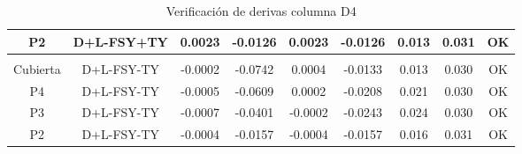 \begin{table}[H]
{\begin{tabular}{|c|c|c|c|c|c|c|c|c|}
    \hline
    P2  & D+L-FSY+TY & 0.0023 & -0.0126 & 0.0023 & -0.0126 & 0.013 & 0.031 & \cellcolor[rgb]{ .776,  .937,  .808}\textcolor[rgb]{ 0,  .38,  0}{OK} \bigstrut\\
    \hline
    \multicolumn{1}{|r}{} & \multicolumn{1}{r}{} & \multicolumn{1}{r}{} & \multicolumn{1}{r}{} & \multicolumn{1}{r}{} & \multicolumn{1}{r}{} & \multicolumn{1}{r}{} & \multicolumn{1}{r}{} &  \bigstrut\\
    \hline
    Cubierta & D+L-FSY-TY & -0.0002 & -0.0742 & 0.0004 & -0.0133 & 0.013 & 0.030 & \cellcolor[rgb]{ .776,  .937,  .808}\textcolor[rgb]{ 0,  .38,  0}{OK} \bigstrut\\
    \hline
    P4  & D+L-FSY-TY & -0.0005 & -0.0609 & 0.0002 & -0.0208 & 0.021 & 0.030 & \cellcolor[rgb]{ .776,  .937,  .808}\textcolor[rgb]{ 0,  .38,  0}{OK} \bigstrut\\
    \hline
    P3  & D+L-FSY-TY & -0.0007 & -0.0401 & -0.0002 & -0.0243 & 0.024 & 0.030 & \cellcolor[rgb]{ .776,  .937,  .808}\textcolor[rgb]{ 0,  .38,  0}{OK} \bigstrut\\
    \hline
    P2  & D+L-FSY-TY & -0.0004 & -0.0157 & -0.0004 & -0.0157 & 0.016 & 0.031 & \cellcolor[rgb]{ .776,  .937,  .808}\textcolor[rgb]{ 0,  .38,  0}{OK} \bigstrut\\
    \hline
    \end{tabular}}%
  \caption{Verificación de derivas columna D4}
  \label{tab:VDD4}%
\end{table}%
